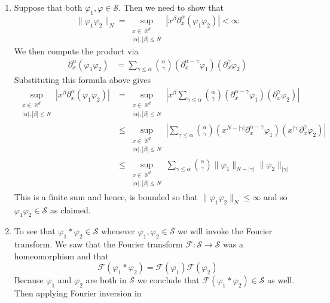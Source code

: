 \documentclass{article}
\DeclareMathOperator{\R}{\mathbb{R}}
\newcommand{\exercise}[1]{\noindent{\textbf{Exercise #1:}}}
\newcommand{\norm}[1]{\|#1\|}
\begin{document}
\exercise{3.4.11}
\begin{enumerate}
\item Suppose that both $\varphi_1,\varphi \in \mathcal{S}$. Then we
  need to show that
  \[
  \norm{\varphi_1\varphi_2}_N = \sup_{\substack{x\in\R^d \\
      |\alpha|,|\beta| \leq N}}
  |x^\beta\partial_x^\alpha(\varphi_1\varphi_2)| <\infty
  \]
  We then compute the product via
  \begin{align*}
    \partial_x^\alpha(\varphi_1\varphi_2) &= \sum_{\gamma \leq
      \alpha}\binom{\alpha}{\gamma}(\partial_x^{\alpha-\gamma}\varphi_1)
    (\partial_x^\gamma \varphi_2)
  \end{align*}
  Substituting this formula above gives
  \begin{align*}
    \sup_{\substack{x\in\R^d \\
        |\alpha|,|\beta| \leq N}}
    |x^\beta\partial_x^\alpha(\varphi_1\varphi_2)| &=
    \sup_{\substack{x\in\R^d \\
        |\alpha|,|\beta| \leq N}} \left|x^{\beta}\sum_{\gamma \leq
        \alpha}\binom{\alpha}{\gamma}(\partial_x^{\alpha-\gamma}\varphi_1)
      (\partial_x^\gamma \varphi_2)\right| \\
    &\leq \sup_{\substack{x\in\R^d \\
        |\alpha|,|\beta| \leq N}}\left|\sum_{\gamma \leq
        \alpha}\binom{\alpha}{\gamma}\left(x^{N -
          |\gamma|}\partial_x^{\alpha-\gamma}\varphi_1\right)
      \left(x^{|\gamma|}\partial_x^\gamma \varphi_2\right)\right| \\
    &\leq \sup_{\substack{x\in\R^d \\
        |\alpha|,|\beta| \leq N}} \sum_{\gamma \leq
      \alpha}\binom{\alpha}{\gamma}\norm{\varphi_1}_{N-|\gamma|}
    \norm{\varphi_{2}}_{|\gamma|}
  \end{align*}
  This is a finite sum and hence, is bounded so that
  $\norm{\varphi_1\varphi_2}_N \leq \infty$ and so $\varphi_1\varphi_2
  \in \mathcal{S}$ as claimed.
\item To see that $\varphi_1 \ast \varphi_2 \in \mathcal{S}$ whenever
  $\varphi_1, \varphi_2 \in \mathcal{S}$ we will invoke the Fourier
  transform. We saw that the Fourier transform $\mathcal{F}:
  \mathcal{S} \to \mathcal{S}$ was a homeomorphism and that
  \[
  \mathcal{F}(\varphi_1 \ast \varphi_2) =
  \mathcal{F}(\varphi_1)\mathcal{F}(\varphi_2)
  \]
  Because $\varphi_1$ and $\varphi_2$ are both in $\mathcal{S}$ we
  conclude that $\mathcal{F}(\varphi_1 \ast \varphi_2) \in
  \mathcal{S}$ as well. Then applying Fourier inversion in

\end{enumerate}
\end{document}
